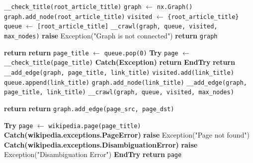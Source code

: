 \documentclass{article}
\begin{document}
	\begin{algorithmic}[1]
		\State \texttt{\_\_check\_title(root\_article\_title)} 
		\State \texttt{graph} $\leftarrow$ \texttt{nx.Graph()}
		\State \texttt{graph.add\_node(root\_article\_title)}
		\State \texttt{visited} $\leftarrow$ \texttt{\{root\_article\_title\}}
		\State \texttt{queue} $\leftarrow$ \texttt{[root\_article\_title]}
		\State \texttt{\_\_crawl(graph, queue, visited, max\_nodes)}
		\State \textbf{raise} Exception("Graph is not connected")
		\EndIf
		\State \textbf{return} \texttt{graph}
		\EndProcedure
		
		\State \textbf{return}
		\EndIf
		\State \textbf{return}
		\EndIf
		\State \texttt{page\_title} $\leftarrow$ \texttt{queue.pop(0)}
		\State \textbf{Try}
		\State \texttt{page} $\leftarrow$ \texttt{\_\_check\_title(page\_title)}
		\State \textbf{Catch(Exception)}
		\State \textbf{return} 
		\State \textbf{EndTry}
		\State \textbf{return}
		\EndIf
		\State \texttt{\_\_add\_edge(graph, page\_title, link\_title)}
		\Else
		\State \texttt{visited.add(link\_title)}
		\State \texttt{queue.append(link\_title)}
		\State \texttt{graph.add\_node(link\_title)}
		\State \texttt{\_\_add\_edge(graph, page\_title, link\_title)}
		\EndIf
		\EndFor
		\State \texttt{\_\_crawl(graph, queue, visited, max\_nodes)}
		\EndProcedure
		
		\State \textbf{return} 
		\EndIf
		\State \textbf{return} 
		\EndIf
		\State \texttt{graph.add\_edge(page\_src, page\_dst)}
		\EndProcedure
		
		\State \textbf{Try}
		\State \texttt{page} $\leftarrow$ \texttt{wikipedia.page(page\_title)}
		\State \textbf{Catch(wikipedia.exceptions.PageError)}
		\State \textbf{raise} Exception("Page not found")
		\State \textbf{Catch(wikipedia.exceptions.DisambiguationError)}
		\State \textbf{raise} Exception("Disambiguation Error")
		\State \textbf{EndTry}
		\State \textbf{return} \texttt{page}
		\EndProcedure
	\end{algorithmic}
	
\end{document}
